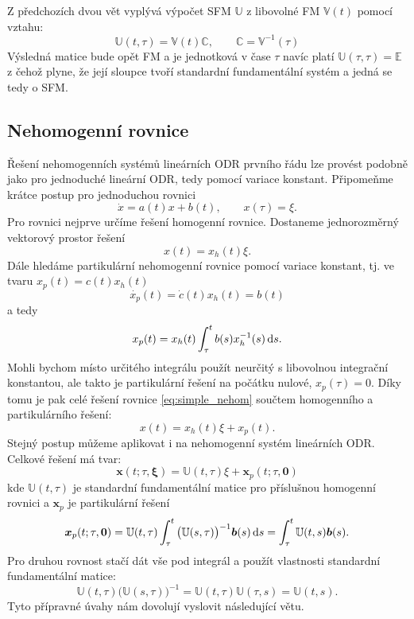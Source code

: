 \documentclass[a4paper, 12pt]{book}
\theoremstyle{definition}
\def\d{\,{\rm d}}               %
\def\vc#1{\mathbf{\boldsymbol{#1}}}     %
\def\tn#1{{\mathbb{#1}}}    %
\begin{document}
Z předchozích dvou vět vyplývá výpočet SFM  $\tn U$ z libovolné FM $\tn V(t)$ pomocí vztahu:
\[
    \tn U(t, \tau) = \tn V(t) \tn C,\qquad \tn C = \tn V^{-1}(\tau)
\]
Výsledná matice bude opět FM a je jednotková v čase $\tau$ navíc platí $\tn U(\tau,\tau) = \tn E$ z čehož plyne, 
že její sloupce tvoří standardní fundamentální systém a jedná se tedy o SFM.


\subsection{Nehomogenní rovnice}
Řešení nehomogenních systémů lineárních ODR prvního řádu lze provést podobně jako pro jednoduché 
lineární ODR, tedy pomocí variace konstant. Připomeňme krátce postup pro jednoduchou rovnici
\begin{equation}
  \label{eq:simple_nehom}
  \dot{x} = a(t)x + b(t), \qquad x(\tau) = \xi.
\end{equation}
Pro rovnici nejprve určíme řešení homogenní rovnice. Dostaneme jednorozměrný vektorový prostor řešení
\[
   x(t) = x_h(t) \xi. 
\]
Dále hledáme partikulární nehomogenní rovnice pomocí variace konstant, tj. ve tvaru $x_p(t) = c(t) x_h(t)$
\[
   \dot{ x_p }(t) = \dot{c}(t) x_h(t) = b(t)
\]
a tedy
\[
   x_p(t) = x_h(t) \int_\tau^t b(s) x_h^{-1} (s) \d s.
\]   
Mohli bychom místo určitého integrálu použít neurčitý s libovolnou integrační konstantou, 
ale takto je partikulární řešení na počátku nulové, $x_p(\tau) = 0$. Díky tomu je pak celé řešení rovnice \eqref{eq:simple_nehom}
součtem homogenního a partikulárního řešení:
\[
   x(t) = x_h(t) \xi + x_p(t).
\]
Stejný postup můžeme aplikovat i na nehomogenní systém lineárních ODR. Celkové řešení má tvar:
\[
   \vc x(t; \tau, \vc \xi) = \tn U(t, \tau) \xi + \vc x_p(t; \tau, \vc 0)
\]
kde $\tn U(t,\tau)$ je standardní fundamentální matice pro příslušnou homogenní rovnici a  $\vc x_p$ je partikulární řešení 
\[
   \vc x_p(t; \tau, \vc 0) = \tn U(t, \tau) \int_\tau^t \big( \tn U(s,\tau)\big)^{-1} \vc b(s) \d s = 
   \int_\tau^t \tn U(t, s) \vc b(s).
\]
Pro druhou rovnost stačí dát vše pod integrál a použít vlastnosti standardní fundamentální matice:
\[
   \tn U(t, \tau) \big(\tn U(s,\tau) \big)^{-1} = \tn U(t,\tau) \tn U(\tau,s) = \tn U(t,s).
\]
Tyto přípravné úvahy nám dovolují vyslovit následující větu.
\end{document}

